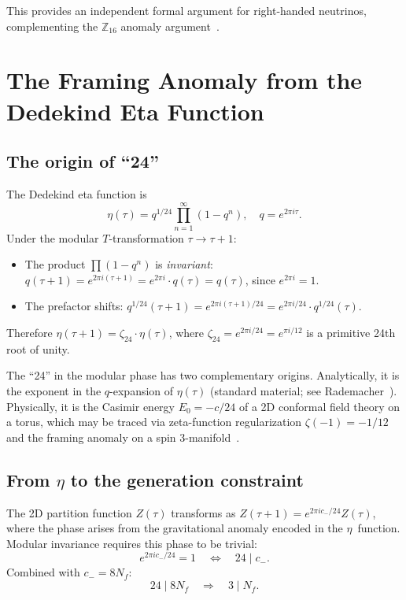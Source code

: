 \documentclass[aps,prl,twocolumn,superscriptaddress]{revtex4-2}
\begin{document}
This provides an independent formal argument for right-handed neutrinos,
complementing the $\mathbb{Z}_{16}$ anomaly argument~\cite{GarciaEtxebarria2019}.

\section{The Framing Anomaly from the Dedekind Eta Function}
\label{sec:framing}

\subsection{The origin of ``24''}

The Dedekind eta function is
\begin{equation}
\eta(\tau) = q^{1/24} \prod_{n=1}^{\infty}(1 - q^n), \quad q = e^{2\pi i \tau}.
\end{equation}
Under the modular $T$-transformation $\tau \to \tau + 1$:
\begin{itemize}
\item The product $\prod(1-q^n)$ is \emph{invariant}: $q(\tau+1) = e^{2\pi i(\tau+1)}
= e^{2\pi i} \cdot q(\tau) = q(\tau)$, since $e^{2\pi i} = 1$.
\item The prefactor shifts: $q^{1/24}(\tau+1) = e^{2\pi i(\tau+1)/24}
= e^{2\pi i/24} \cdot q^{1/24}(\tau)$.
\end{itemize}
Therefore $\eta(\tau+1) = \zeta_{24} \cdot \eta(\tau)$, where
$\zeta_{24} = e^{2\pi i/24} = e^{\pi i/12}$ is a primitive 24th root of unity.

The ``24'' in the modular phase has two complementary origins. Analytically,
it is the exponent in the $q$-expansion of $\eta(\tau)$ (standard material;
see Rademacher~\cite{Rademacher1973}). Physically, it is the Casimir energy
$E_0 = -c/24$ of a 2D conformal field theory on a torus, which may be
traced via zeta-function regularization $\zeta(-1)=-1/12$ and the
framing anomaly on a spin 3-manifold~\cite{diFrancesco1997}.

\subsection{From $\eta$ to the generation constraint}

The 2D partition function $Z(\tau)$ transforms as
$Z(\tau+1) = e^{2\pi i c_-/24} Z(\tau)$, where the phase arises from
the gravitational anomaly encoded in the $\eta$~function. Modular invariance
requires this phase to be trivial:
\begin{equation}
e^{2\pi i c_-/24} = 1 \quad \Longleftrightarrow \quad 24 \mid c_-.
\end{equation}
Combined with $c_- = 8 N_f$:
\begin{equation}
24 \mid 8 N_f \quad \Longrightarrow \quad 3 \mid N_f.
\label{eq:gen_constraint}
\end{equation}
\end{document}

